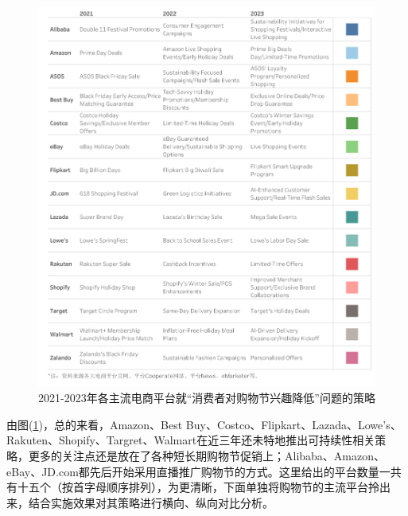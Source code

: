 \documentclass[12pt]{ctexart}
\begin{document}
\begin{figure}[htbp!]
    \centering
    \includegraphics[width=1\textwidth]{Images/18.png}
    \caption{2021-2023年各主流电商平台就“消费者对购物节兴趣降低”问题的策略}
    \label{strategies}
\end{figure}

由图(\ref{strategies})，总的来看，Amazon、Best Buy、Costco、Flipkart、Lazada、Lowe's、Rakuten、Shopify、Targret、Walmart在近三年还未特地推出可持续性相关策略，更多的关注点还是放在了各种短长期购物节促销上；Alibaba、Amazon、eBay、JD.com都先后开始采用直播推广购物节的方式。这里给出的平台数量一共有十五个（按首字母顺序排列），为更清晰，下面单独将购物节的主流平台拎出来，结合实施效果对其策略进行横向、纵向对比分析。
\end{document}
